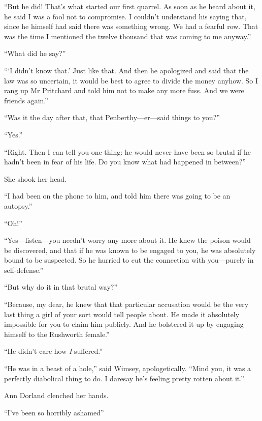 \enquote{But he did! That's what started our first quarrel. As soon as he heard about it, he said I was a fool not to compromise. I couldn't understand his saying that, since he himself had said there was something wrong. We had a fearful row. That was the time I mentioned the twelve thousand that was coming to me anyway.}

\enquote{What did he say?}

\enquote{\enquote{I didn't know that.} Just like that. And then he apologized and said that the law was so uncertain, it would be best to agree to divide the money anyhow. So I rang up Mr Pritchard and told him not to make any more fuss. And we were friends again.}

\enquote{Was it the day after that, that Penberthy\allowbreak---\allowbreak er---said things to you?}

\enquote{Yes.}

\enquote{Right. Then I can tell you one thing: he would never have been so brutal if he hadn't been in fear of his life. Do you know what had happened in between?}

She shook her head.

\enquote{I had been on the phone to him, and told him there was going to be an autopsy.}

\enquote{Oh!}

\enquote{Yes\allowbreak---\allowbreak listen---you needn't worry any more about it. He knew the poison would be discovered, and that if he was known to be engaged to you, he was absolutely bound to be suspected. So he hurried to cut the connection with you\allowbreak---\allowbreak purely in self-defense.}

\enquote{But why do it in that brutal way?}

\enquote{Because, my dear, he knew that that particular accusation would be the very last thing a girl of your sort would tell people about. He made it absolutely impossible for you to claim him publicly. And he bolstered it up by engaging himself to the Rushworth female.}

\enquote{He didn't care how \textit{I} suffered.}

\enquote{He was in a beast of a hole,} said Wimsey, apologetically. \enquote{Mind you, it was a perfectly diabolical thing to do. I daresay he's feeling pretty rotten about it.}

Ann Dorland clenched her hands.

\enquote{I've been so horribly ashamed\longdash}

